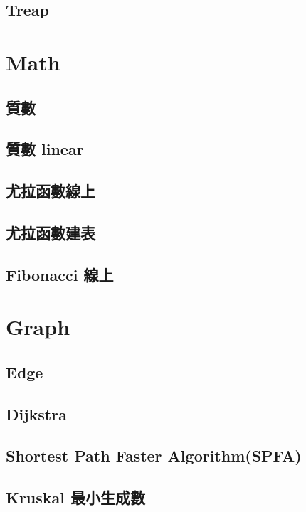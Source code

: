 \subsection{Treap}


\section{Math}
\subsection{質數}

\subsection{質數 linear}

\subsection{尤拉函數線上}

\subsection{尤拉函數建表}

\subsection{Fibonacci 線上}


\section{Graph}
\subsection{Edge}

\subsection{Dijkstra}

\subsection{Shortest Path Faster Algorithm(SPFA)}

\subsection{Kruskal 最小生成數}

